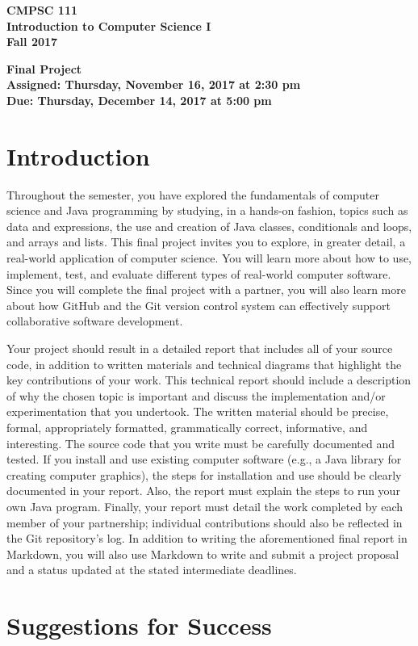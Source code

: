 \documentclass[11pt]{article}
\newcommand{\assignmentduedate}{December 14}
\newcommand{\assignmentassignedate}{November 16}
\newcommand{\labyear}{2017}
\newcommand{\labday}{Thursday}
\newcommand{\labtime}{2:30 pm}
\newcommand{\labduetime}{5:00 pm}
\newcommand{\assigneddate}{Assigned: \labday, \assignmentassignedate, \labyear{} at \labtime{}}
\newcommand{\duedate}{Due: \labday, \assignmentduedate, \labyear{} at \labduetime{}}
\newcommand{\labtitle}[1]
{
  \begin{center}
    \begin{center}
      \bf
      CMPSC 111\\Introduction to Computer Science I\\
      Fall 2017\\
      \medskip
    \end{center}
    \bf
    #1
  \end{center}
}
\begin{document}
\thispagestyle{empty}

\labtitle{Final Project \\ \assigneddate{} \\ \duedate{}}

\section*{Introduction}

Throughout the semester, you have explored the fundamentals of computer science and Java programming by studying, in a
hands-on fashion, topics such as data and expressions, the use and creation of Java classes, conditionals and loops, and
arrays and lists. This final project invites you to explore, in greater detail, a real-world application of computer
science. You will learn more about how to use, implement, test, and evaluate different types of real-world computer
software. Since you will complete the final project with a partner, you will also learn more about how GitHub and the
Git version control system can effectively support collaborative software development.

Your project should result in a detailed report that includes all of your source code, in addition to written materials
and technical diagrams that highlight the key contributions of your work. This technical report should include a
description of why the chosen topic is important and discuss the implementation and/or experimentation that you
undertook. The written material should be precise, formal, appropriately formatted, grammatically correct, informative,
and interesting. The source code that you write must be carefully documented and tested. If you install and use existing
computer software (e.g., a Java library for creating computer graphics), the steps for installation and use should be
clearly documented in your report. Also, the report must explain the steps to run your own Java program. Finally, your
report must detail the work completed by each member of your partnership; individual contributions should also be
reflected in the Git repository's log. In addition to writing the aforementioned final report in Markdown, you will also
use Markdown to write and submit a project proposal and a status updated at the stated intermediate deadlines.

\section*{Suggestions for Success}
\end{document}
